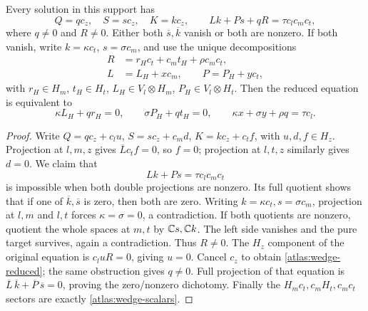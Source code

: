 \begin{lemma}\label{atlas:wedge-reduction}
Every solution in this support has
\begin{equation}\label{atlas:wedge-reduced}
 Q=q c_z,\quad S=s c_z,\quad K=k c_z,\qquad
 Lk+Ps+qR=\tau c_lc_mc_t,
\end{equation}
where \(q\ne0\) and \(R\ne0\).  Either both \(\overline s,\overline k\)
vanish or both are nonzero.
If both vanish, write \(k=\kappa c_t\), \(s=\sigma c_m\), and use the unique
decompositions
\[
 \begin{split}
 R&=r_Hc_t+c_mt_H+\rho c_mc_t,\\
 L&=L_H+xc_m,\qquad P=P_H+yc_t,
 \end{split}
\]
with \(r_H\in H_m\), \(t_H\in H_t\),
\(L_H\in V_l\otimes H_m\), \(P_H\in V_l\otimes H_t\).
Then the reduced equation is equivalent to
\begin{equation}\label{atlas:wedge-scalars}
 \kappa L_H+qr_H=0,\qquad
 \sigma P_H+qt_H=0,\qquad
 \kappa x+\sigma y+\rho q=\tau c_l.
\end{equation}
\end{lemma}

\begin{proof}
Write
\(Q=q c_z+c_lu\), \(S=s c_z+c_md\), \(K=k c_z+c_tf\), with
\(u,d,f\in H_z\).  Projection at \(l,m,z\) gives
\(\overline Lc_tf=0\), so \(f=0\); projection at \(l,t,z\) similarly gives
\(d=0\).
We claim that
\begin{equation}\label{atlas:two-term-obstruction}
 Lk+Ps=\tau c_lc_mc_t
\end{equation}
is impossible when both double projections are nonzero.
Its full quotient shows that if one of \(\overline k,\overline s\) is zero,
then both are zero.  Writing \(k=\kappa c_t,s=\sigma c_m\), projection at
\(l,m\) and \(l,t\) forces \(\kappa=\sigma=0\), a contradiction.
If both quotients are nonzero, quotient the whole spaces at \(m,t\) by
\(\mathbb C s,\mathbb C k\).  The left side vanishes and the pure target survives,
again a contradiction.
Thus \(R\ne0\).  The \(H_z\) component of the original equation is
\(c_luR=0\), giving \(u=0\).  Cancel \(c_z\) to obtain
\eqref{atlas:wedge-reduced}; the same obstruction gives \(q\ne0\).
Full projection of that equation is
\(\overline L\,\overline k+\overline P\,\overline s=0\), proving the
zero/nonzero dichotomy.  Finally the \(H_mc_t,c_mH_t,c_mc_t\) sectors are
exactly \eqref{atlas:wedge-scalars}.
\end{proof}

